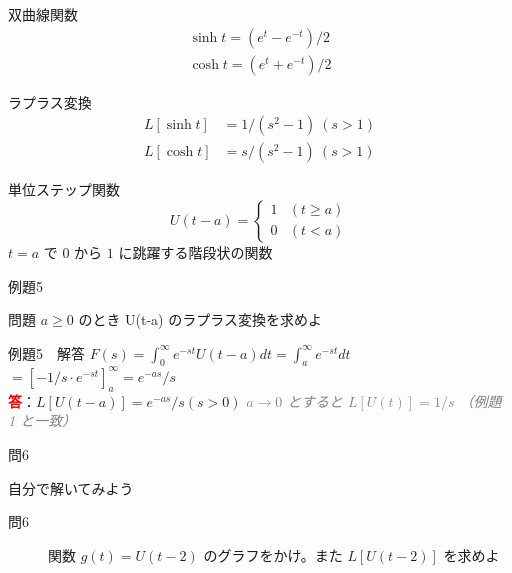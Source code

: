 \documentclass[professionalfonts]{beamer}
\begin{document}
\begin{frame}{双曲線関数}
  \begin{align*}
    \sinh t = (e^t - e^{-t}) / 2 \\
    \cosh t = (e^t + e^{-t}) / 2
  \end{align*}
  \begin{block}{ラプラス変換}
  \begin{align*}
    L[\sinh t] &= 1/(s^{2}-1) \ (s > 1) \\
    L[\cosh t] &= s/(s^{2}-1) \ (s > 1)
  \end{align*}
  \end{block}
\end{frame}

\begin{frame}{単位ステップ関数}
  \[
    U(t-a) = \begin{cases} 1 & (t \geq a) \\ 0 & (t < a) \end{cases}
  \]
  $t = a$ で $0$ から $1$ に跳躍する階段状の関数
\end{frame}

\begin{frame}{例題5}
  \begin{exampleblock}{問題}
    $a \geq 0$ のとき U(t-a) のラプラス変換を求めよ\\[2pt]
  \end{exampleblock}
\end{frame}

\begin{frame}{例題5　解答}
  $F(s) = \int_{0}^\infty e^{-st}U(t-a)dt = \int_{a}^\infty e^{-st}dt$\\[4pt]
  $= [-1/s \cdot e^{-st}]_{a}^\infty = e^{-as}/s$
  \\[8pt]\textcolor{red}{\textbf{答}}：$L[U(t-a)] = e^{-as}/s  (s > 0)$
  {\footnotesize \textcolor{gray}{\textit{$a \to 0$ とすると $L[U(t)] = 1/s$ （例題 1 と一致）}}}
\end{frame}

\begin{frame}{問6}
  \begin{exampleblock}{自分で解いてみよう}
  \begin{description}
    \item[問6] 関数 $g(t) = U(t-2)$ のグラフをかけ。また $L[U(t-2)]$ を求めよ
  \end{description}
  \end{exampleblock}
\end{frame}
\end{document}
